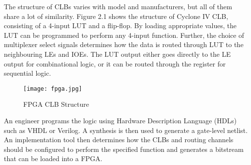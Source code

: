 The structure of CLBs varies with model and manufacturers, but all of them share a lot of similarity. Figure 2.1 shows the structure of Cyclone IV CLB, consisting of a 4-input LUT and a flip-flop. By loading appropriate values, the LUT can be programmed to perform any 4-input function. Further, the choice of multiplexer select signals determines how the data is routed through LUT to the neighbouring LEs and IOEs. The LUT output either goes directly to the LE output for combinational logic, or it can be routed through the register for sequential logic.
\begin{figure}[H]
\centering
\texttt{[image: fpga.jpg]}
\caption{FPGA CLB Structure}\label{fig:fpga}
\end{figure}

An engineer programs the logic using Hardware Description Language (HDLs) such as VHDL or Verilog. A synthesis is then used to generate a gate-level netlist. An implementation tool then determines how the CLBs and routing channels should be configured to perform the specified function and generates a bitstream that can be loaded into a FPGA.
